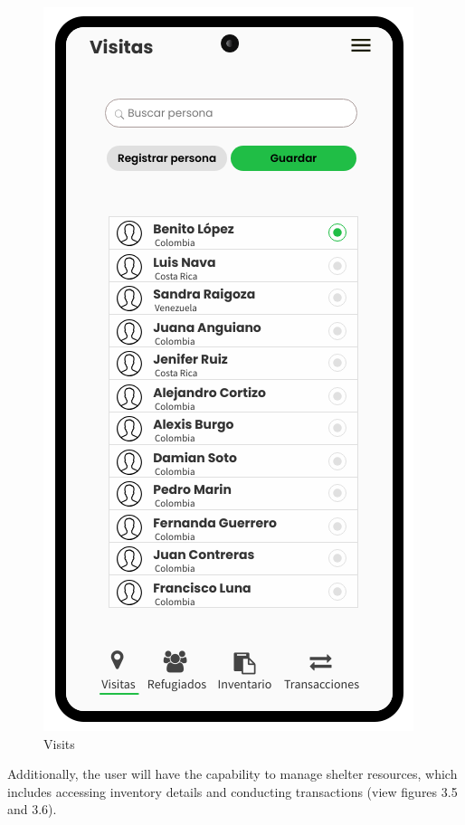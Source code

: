 \documentclass{scrreprt}
\begin{document}
\begin{figure}[H]
\begin{minipage}{0.4\textwidth}
     \includegraphics[width=.7\linewidth]{Visitas}
     \caption{Visits}\label{Fig:Data2}
   \end{minipage}
\end{figure}
Additionally, the user will have the capability to manage shelter resources, which includes accessing inventory details and conducting transactions (view figures 3.5 and 3.6).
\end{document}
